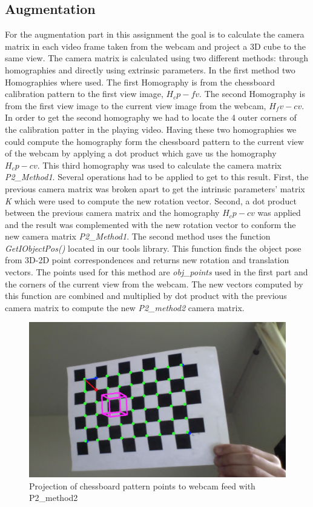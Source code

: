 \subsection{Augmentation}
For the augmentation part in this assignment the goal is to calculate the camera matrix in each video frame taken from the webcam and project a 3D cube to the same view. The camera matrix is calculated using two different methods: through homographies and directly using extrinsic parameters. \newline
In the first method two Homographies where used. The first Homography is from the chessboard calibration pattern to the first view image, \(H_cp-fv\). The second Homography is from the first view image to the current view image from the webcam, \(H_fv-cv\). In order to get the second homography we had to locate the 4 outer corners of the calibration patter in the playing video. Having these two homographies we could compute the homography form the chessboard pattern to the current view of the webcam by applying a dot product which gave us the homography \(H_cp-cv\). This third homography was used to calculate the camera matrix \textsl{P2\_Method1}. Several operations had to be applied to get to this result. First, the previous camera matrix was broken apart to get the intrinsic parameters' matrix \textsl{K} which were used to compute the new rotation vector. Second, a dot product between the previous camera matrix and the homography \(H_cp-cv\) was applied and the result was complemented with the new rotation vector to conform the new camera matrix \textsl{P2\_Method1}.\newline
The second method uses the function \textsl{GetIObjectPos()} located in our tools library. This function finds the object pose from 3D-2D point correspondences and returns new rotation and translation vectors. The points used for this method are \textsl{obj\_points} used in the first part and the corners of the current view from the webcam. The new vectors computed by this function are combined and multiplied by dot product with the previous camera matrix to compute the new \textsl{P2\_method2} camera matrix.
\begin{figure}
	\centering
	\includegraphics[scale=0.3]{images/p2_method2.jpg}
	\caption{Projection of chessboard pattern points to webcam feed with P2\_method2}
	\label{fig:method2}
\end{figure}


